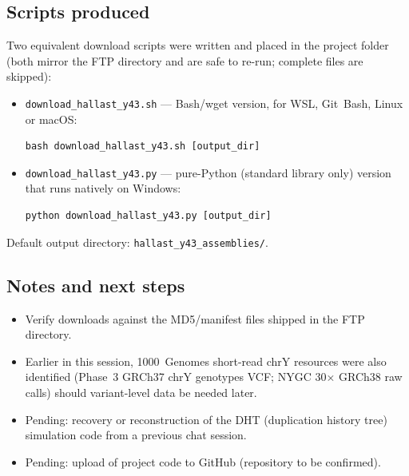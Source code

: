 \documentclass[11pt,a4paper]{article}
\begin{document}
\subsection{Scripts produced}
Two equivalent download scripts were written and placed in the project
folder (both mirror the FTP directory and are safe to re-run; complete
files are skipped):
\begin{itemize}
  \item \texttt{download\_hallast\_y43.sh} --- Bash/wget version, for
  WSL, Git~Bash, Linux or macOS:
  \begin{lstlisting}
bash download_hallast_y43.sh [output_dir]
  \end{lstlisting}
  \item \texttt{download\_hallast\_y43.py} --- pure-Python (standard
  library only) version that runs natively on Windows:
  \begin{lstlisting}
python download_hallast_y43.py [output_dir]
  \end{lstlisting}
\end{itemize}
Default output directory: \texttt{hallast\_y43\_assemblies/}.

\subsection{Notes and next steps}
\begin{itemize}
  \item Verify downloads against the MD5/manifest files shipped in the
  FTP directory.
  \item Earlier in this session, 1000~Genomes short-read chrY resources
  were also identified (Phase~3 GRCh37 chrY genotypes VCF; NYGC 30$\times$
  GRCh38 raw calls) should variant-level data be needed later.
  \item Pending: recovery or reconstruction of the DHT (duplication
  history tree) simulation code from a previous chat session.
  \item Pending: upload of project code to GitHub (repository to be
  confirmed).
\end{itemize}
\end{document}
